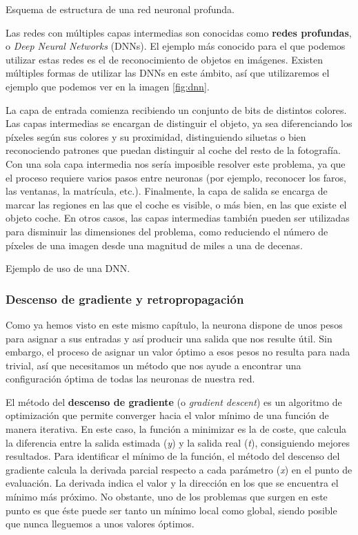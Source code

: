 %
       {Esquema de estructura de una red neuronal profunda.}

Las redes con múltiples capas intermedias son conocidas como \textbf{redes profundas}, o \textit{Deep Neural Networks} (DNNs). El ejemplo más conocido para el que podemos utilizar estas redes es el de reconocimiento de objetos en imágenes. Existen múltiples formas de utilizar las DNNs en este ámbito, así que utilizaremos el ejemplo que podemos ver en la imagen \ref{fig:dnn}. 

La capa de entrada comienza recibiendo un conjunto de bits de distintos colores. Las capas intermedias se encargan de distinguir el objeto, ya sea diferenciando los píxeles según sus colores y su proximidad, distinguiendo siluetas o bien reconociendo patrones que puedan distinguir al coche del resto de la fotografía. Con una sola capa intermedia nos sería imposible resolver este problema, ya que el proceso requiere varios pasos entre neuronas (por ejemplo, reconocer los faros, las ventanas, la matrícula, etc.). Finalmente, la capa de salida se encarga de marcar las regiones en las que el coche es visible, o más bien, en las que existe el objeto coche. En otros casos, las capas intermedias también pueden ser utilizadas para disminuir las dimensiones del problema, como reduciendo el número de píxeles de una imagen desde una magnitud de miles a una de decenas.

%
       {Ejemplo de uso de una DNN.}    

\subsubsection{Descenso de gradiente y retropropagación}

Como ya hemos visto en este mismo capítulo, la neurona dispone de unos pesos para asignar a sus entradas y así producir una salida que nos resulte útil. Sin embargo, el proceso de asignar un valor óptimo a esos pesos no resulta para nada trivial, así que necesitamos un método que nos ayude a encontrar una configuración óptima de todas las neuronas de nuestra red.
 
El método del \textbf{descenso de gradiente} (o \textit{gradient descent}) es un algoritmo de optimización que permite converger hacia el valor mínimo de una función de manera iterativa. En este caso, la función a minimizar es la de coste, que calcula la diferencia entre la salida estimada (\textit{y}) y la salida real (\textit{t}), consiguiendo mejores resultados. Para identificar el mínimo de la función, el método del descenso del gradiente calcula la derivada parcial respecto a cada parámetro (\textit{x}) en el punto de evaluación. La derivada indica el valor y la dirección en los que se encuentra el mínimo más próximo. No obstante, uno de los problemas que surgen en este punto es que éste puede ser tanto un mínimo local como global, siendo posible que nunca lleguemos a unos valores óptimos.

